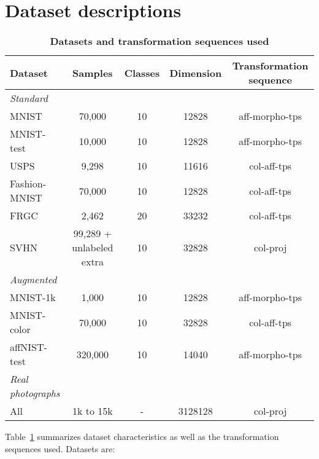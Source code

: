 \documentclass{article}
\begin{document}
\section{Dataset descriptions}\label{sec:dataset}
\vspace{-1.5em}
\begin{table}[h!]
  \small
  \caption{\bf Datasets and transformation sequences used}
  \centering
  \addtolength{\tabcolsep}{-4pt}
  \begin{tabular}{@{}lcccc@{}}\toprule
  Dataset & Samples & Classes & Dimension & Transformation sequence\\\midrule
  \textit{Standard}\\
  \quad MNIST~\cite{lecunGradientBasedLearningApplied1998} & 70,000 & 10 & 
  12828 & aff-morpho-tps\\
  \quad MNIST-test~\cite{lecunGradientBasedLearningApplied1998} & 10,000 & 10 & 
  12828 & aff-morpho-tps\\
  \quad USPS~\cite{hastie01statisticallearning} & 9,298 & 10 & 11616 & 
  col-aff-tps\\
  \quad Fashion-MNIST~\cite{xiao2017fashion} & 70,000 & 10 & 12828 & 
  col-aff-tps\\
  \quad FRGC~\cite{FRGC} & 2,462 & 20 & 33232 & col-aff-tps\\
  \quad SVHN~\cite{netzer2011reading}& 99,289 + unlabeled extra & 10 & 32828 
  & col-proj\\
  \midrule
  \textit{Augmented}\\
  \quad MNIST-1k & 1,000 & 10 & 12828 & aff-morpho-tps\\
  \quad MNIST-color & 70,000 & 10 & 32828 & col-aff-tps\\
  \quad affNIST-test & 320,000 & 10 & 14040 & aff-morpho-tps\\
  \midrule
  \textit{Real photographs}\\
  \quad All & 1k to 15k & - & 3128128 & col-proj\\
  \bottomrule
  \end{tabular}
  \label{tab:dataset}
\end{table}
Table~\ref{tab:dataset} summarizes dataset characteristics as well as the transformation 
sequences used. Datasets are:
\end{document}
